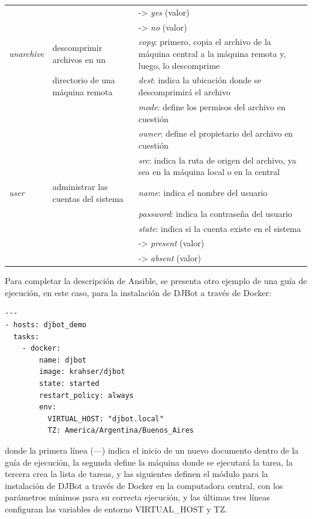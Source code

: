 \documentclass[a4paper,12pt]{article}
\begin{document}
{\begin{center}
\begin{tabulary}{\textwidth}{l|l|L}
 &  & -> \emph{yes} (valor)\\
 &  & -> \emph{no} (valor)\\
\hline
\emph{unarchive} & descomprimir archivos en un & \emph{copy}: primero, copia el archivo de la máquina central a la máquina remota y, luego, lo descomprime\\
 & directorio de una máquina remota & \emph{dest}: indica la ubicación donde se descomprimirá el archivo\\
 &  & \emph{mode}: define los permisos del archivo en cuestión\\
 &  & \emph{owner}: define el propietario del archivo en cuestión\\
 &  & \emph{src}: indica la ruta de origen del archivo, ya sea en la máquina local o en la central\\
\hline
\emph{user} & administrar las cuentas del sistema & \emph{name}: indica el nombre del usuario\\
 &  & \emph{password}: indica la contraseña del usuario\\
 &  & \emph{state}: indica si la cuenta existe en el sistema\\
 &  & -> \emph{present} (valor)\\
 &  & -> \emph{absent} (valor)\\
\hline
\end{tabulary}
\end{center}


}



Para completar la descripción de Ansible, se presenta otro ejemplo de una guía de ejecución, en este caso, para la instalación de DJBot a través de Docker:\\

\begin{verbatim}
---
- hosts: djbot_demo
  tasks:
    - docker:
        name: djbot
        image: krahser/djbot
        state: started
        restart_policy: always
        env:
          VIRTUAL_HOST: "djbot.local"
          TZ: America/Argentina/Buenos_Aires
\end{verbatim}

donde la primera línea (---) indica el inicio de un nuevo documento dentro de la guía de ejecución, la segunda define la máquina donde se ejecutará la tarea, la tercera crea la lista de tareas, y las siguientes definen el módulo para la instalación de DJBot a través de Docker en la computadora central, con los parámetros mínimos para su correcta ejecución, y las últimas tres líneas configuran las variables de entorno VIRTUAL\_HOST y TZ.\\
\end{document}
